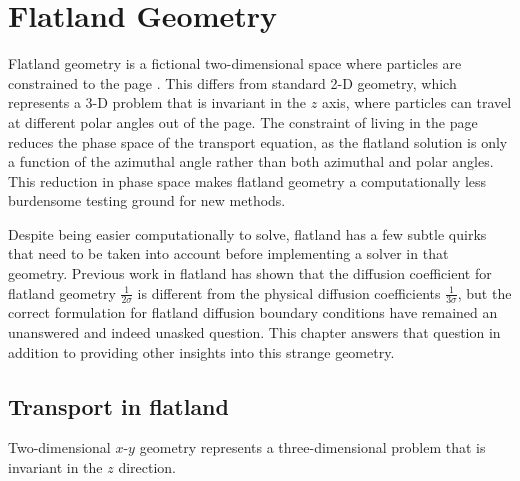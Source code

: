 
\chapter{Flatland Geometry}

Flatland geometry is a fictional two-dimensional space where particles are
constrained to the page \cite{Abb1884,Asa2008}. This differs from standard 2-D
geometry, which represents a 3-D problem that is invariant in the $z$ axis,
where particles can travel at different polar angles out of the page. The
constraint of living in the page reduces the phase space of the transport
equation, as the flatland solution is only a function of the azimuthal angle
rather than both azimuthal and polar angles. This reduction in phase space makes 
flatland geometry a computationally less burdensome testing ground for new
methods.

Despite being easier computationally to solve, flatland has a few subtle quirks
that need to be taken into account before implementing a solver in that
geometry. Previous work in flatland \cite{Asa2008,Lar2009c} has shown that the
diffusion coefficient for flatland geometry $\frac{1}{2\sigma}$ is different from
the physical diffusion coefficients $\frac{1}{3\sigma}$, but the correct
formulation for flatland diffusion boundary
conditions have remained an unanswered and indeed unasked question. This
chapter answers that question in addition to providing other insights into this
strange geometry.

\section{Transport in flatland}

Two-dimensional $x$-$y$ geometry represents a three-dimensional problem that is
invariant in the $z$ direction. 

